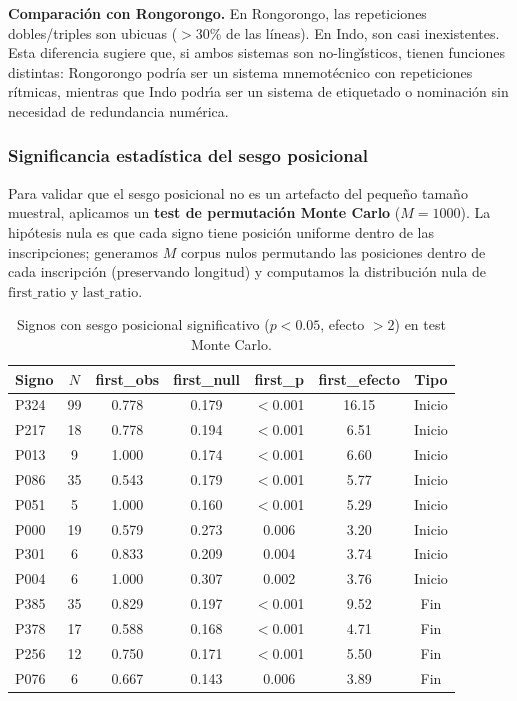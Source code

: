 \textbf{Comparaci\'on con Rongorongo.} En Rongorongo, las repeticiones dobles/triples son ubicuas ($>$30\% de las l\'ineas). En Indo, son casi inexistentes. Esta diferencia sugiere que, si ambos sistemas son no-ling\u\'isticos, tienen funciones distintas: Rongorongo podr\'ia ser un sistema mnemot\'ecnico con repeticiones r\'itmicas, mientras que Indo podr\'\i a ser un sistema de etiquetado o nominaci\'on sin necesidad de redundancia num\'erica.

\subsubsection{Significancia estad\'istica del sesgo posicional}

Para validar que el sesgo posicional no es un artefacto del peque\~no tama\~no muestral, aplicamos un \textbf{test de permutaci\'on Monte Carlo} ($M=1000$). La hip\'otesis nula es que cada signo tiene posici\'on uniforme dentro de las inscripciones; generamos $M$ corpus nulos permutando las posiciones dentro de cada inscripci\'on (preservando longitud) y computamos la distribuci\'on nula de $\text{first\_ratio}$ y $\text{last\_ratio}$.

\begin{table}[h]
\centering
\caption{Signos con sesgo posicional significativo ($p<0.05$, efecto $>2$) en test Monte Carlo.}
\label{tab:montecarlo}
\begin{tabular}{lcccccc}
\toprule
Signo & $N$ & first\_obs & first\_null & first\_p & first\_efecto & Tipo \\
\midrule
P324 & 99 & 0.778 & 0.179 & $<$0.001 & 16.15 & Inicio \\
P217 & 18 & 0.778 & 0.194 & $<$0.001 & 6.51 & Inicio \\
P013 & 9 & 1.000 & 0.174 & $<$0.001 & 6.60 & Inicio \\
P086 & 35 & 0.543 & 0.179 & $<$0.001 & 5.77 & Inicio \\
P051 & 5 & 1.000 & 0.160 & $<$0.001 & 5.29 & Inicio \\
P000 & 19 & 0.579 & 0.273 & 0.006 & 3.20 & Inicio \\
P301 & 6 & 0.833 & 0.209 & 0.004 & 3.74 & Inicio \\
P004 & 6 & 1.000 & 0.307 & 0.002 & 3.76 & Inicio \\
\midrule
P385 & 35 & 0.829 & 0.197 & $<$0.001 & 9.52 & Fin \\
P378 & 17 & 0.588 & 0.168 & $<$0.001 & 4.71 & Fin \\
P256 & 12 & 0.750 & 0.171 & $<$0.001 & 5.50 & Fin \\
P076 & 6 & 0.667 & 0.143 & 0.006 & 3.89 & Fin \\
\bottomrule
\end{tabular}
\end{table}

